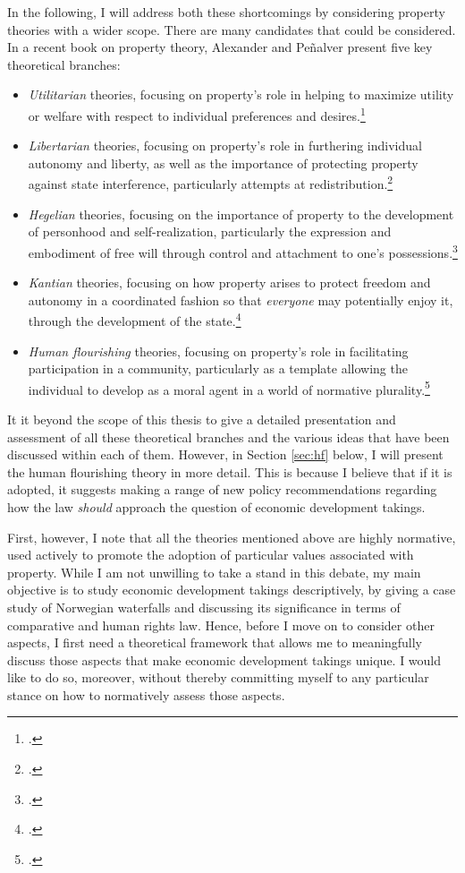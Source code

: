 In the following, I will address both these shortcomings by considering property theories with a wider scope. There are many candidates that could be considered. In a recent book on property theory, Alexander and Pe\~{n}alver present five key theoretical branches: 
\begin{itemize}
\item {\it Utilitarian} theories, focusing on property's role in helping to maximize utility or welfare with respect to individual preferences and desires.\footnote{\cite[Chapter 1]{alexander10}.} 
\item {\it Libertarian} theories, focusing on property's role in furthering individual autonomy and liberty, as well as the importance of protecting property against state interference, particularly attempts at redistribution.\footnote{\cite[Chapter 2]{alexander10}.} 
\item {\it Hegelian} theories, focusing on the importance of property to the development of personhood and self-realization, particularly the expression and embodiment of free will through control and attachment to one's possessions.\footnote{\cite[Chapter 3]{alexander10}.}
\item {\it Kantian} theories, focusing on how property arises to protect freedom and autonomy in a coordinated fashion so that {\it everyone} may potentially enjoy it, through the development of the state.\footnote{\cite[Chapter 4]{alexander10}.}
\item {\it  Human flourishing} theories, focusing on property's role in facilitating participation in a community, particularly as a template allowing the individual to develop as a moral agent in a world of normative plurality.\footnote{\cite[Chapter 5]{alexander10}.}
\end{itemize}

It it beyond the scope of this thesis to give a detailed presentation and assessment of all these theoretical branches and the various ideas that have been discussed within each of them. However, in Section \ref{sec:hf} below, I will present the human flourishing theory in more detail. This is because I believe that if it is adopted, it suggests making a range of new policy recommendations regarding how the law {\it should} approach the question of economic development takings. 

First, however, I note that all the theories mentioned above are highly normative, used actively to promote the adoption of particular values associated with property. While I am not unwilling to take a stand in this debate, my main objective is to study economic development takings descriptively, by giving a case study of Norwegian waterfalls and discussing its significance in terms of comparative and human rights law. Hence, before I move on to consider other aspects, I first need a theoretical framework that allows me to meaningfully discuss those aspects that make economic development takings unique. I would like to do so, moreover, without thereby committing myself to any particular stance on how to normatively assess those aspects. 

